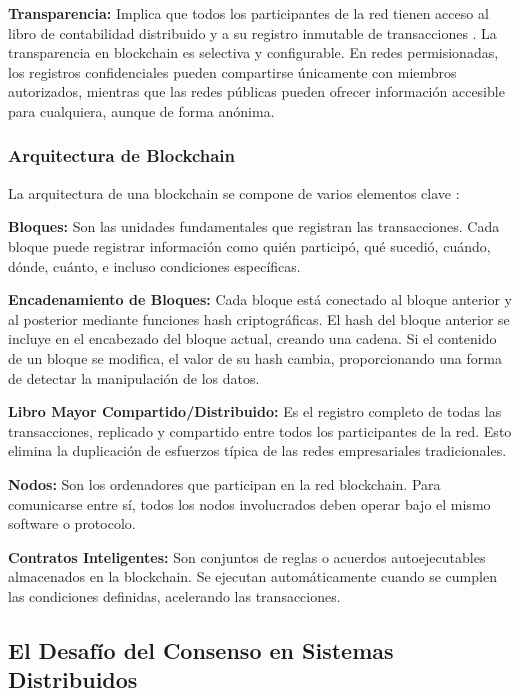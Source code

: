 \documentclass[spanish,12pt,letterpaper]{report}
\begin{document}
\textbf{Transparencia:} Implica que todos los participantes de la red tienen acceso al libro de contabilidad distribuido y a su registro inmutable de transacciones \parencite{ibm2025blockchain}. La transparencia en blockchain es selectiva y configurable. En redes permisionadas, los registros confidenciales pueden compartirse únicamente con miembros autorizados, mientras que las redes públicas pueden ofrecer información accesible para cualquiera, aunque de forma anónima.

\subsubsection{Arquitectura de Blockchain}

La arquitectura de una blockchain se compone de varios elementos clave \parencite{bartolomeo2025intro}:

\textbf{Bloques:} Son las unidades fundamentales que registran las transacciones. Cada bloque puede registrar información como quién participó, qué sucedió, cuándo, dónde, cuánto, e incluso condiciones específicas.

\textbf{Encadenamiento de Bloques:} Cada bloque está conectado al bloque anterior y al posterior mediante funciones hash criptográficas. El hash del bloque anterior se incluye en el encabezado del bloque actual, creando una cadena. Si el contenido de un bloque se modifica, el valor de su hash cambia, proporcionando una forma de detectar la manipulación de los datos.

\textbf{Libro Mayor Compartido/Distribuido:} Es el registro completo de todas las transacciones, replicado y compartido entre todos los participantes de la red. Esto elimina la duplicación de esfuerzos típica de las redes empresariales tradicionales.

\textbf{Nodos:} Son los ordenadores que participan en la red blockchain. Para comunicarse entre sí, todos los nodos involucrados deben operar bajo el mismo software o protocolo.

\textbf{Contratos Inteligentes:} Son conjuntos de reglas o acuerdos autoejecutables almacenados en la blockchain. Se ejecutan automáticamente cuando se cumplen las condiciones definidas, acelerando las transacciones.

\subsection{El Desafío del Consenso en Sistemas Distribuidos}
\end{document}
